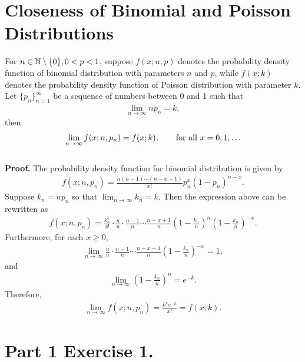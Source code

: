 \section*{Closeness of Binomial and Poisson Distributions}

For $n\in \mathbb{N}\setminus\{0\}, 0 < p < 1$, suppose $f(x; n, p)$ denotes the probability density function of binomial distribution with parameters $n$ and $p$, while $f(x; k)$ denotes the probability density function of Poisson distribution with parameter $k$. Let $\{p_n\}_{n=1}^{\infty}$ be a sequence of numbers between 0 and 1 such that
\begin{align*}
\lim_{n\rightarrow\infty} np_n = k,
\end{align*}
then
\begin{align*}
\lim_{n\rightarrow \infty} f(x; n, p_n) = f(x; k), \qquad \mathrm{for\ all\ } x = 0, 1, \ldots
\end{align*}
~\\
\textbf{Proof.} The probability density function for binomial distribution is given by
\begin{align*}
f(x; n, p_n) = \frac{n(n-1)\cdots (n-x+1)}{x!}p_n^x (1-p_n)^{n-x}.
\end{align*}
Suppose $k_n = np_n$ so that $\lim_{n\rightarrow \infty} k_n = k$. Then the expression above can be rewritten as 
\begin{align*}
f(x; n, p_n) = \frac{k_n^x}{x!}\cdot \frac{n}{n}\cdot \frac{n-1}{n}\cdots \frac{n-x+1}{n}\left(1 - \frac{k_n}{n} \right)^n \left(1 - \frac{k_n}{n} \right)^{-x}.
\end{align*}
Furthermore, for each $x\geq 0$,
\begin{align*}
\lim_{n\rightarrow \infty} \frac{n}{n} \cdot \frac{n-1}{n}\cdots \frac{n-x+1}{n}\left(1 - \frac{k_n}{n} \right)^{-x} = 1,
\end{align*}
and
\begin{align*}
\lim_{n\rightarrow \infty} \left(1 - \frac{k_n}{n} \right)^n = e^{-k}.
\end{align*}
Therefore,
\begin{align*}
\lim_{n\rightarrow \infty} f(x; n, p_n) = \frac{k^xe^{-k}}{x!} = f(x; k).
\end{align*}

\section*{Part 1 Exercise 1.}

